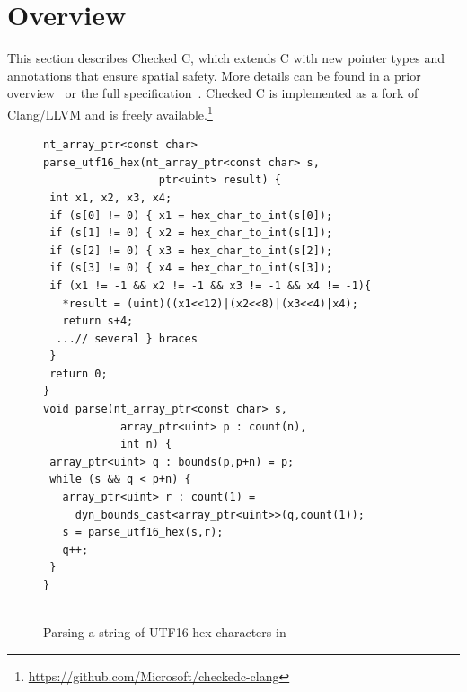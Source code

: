 \documentclass[conference]{IEEEtran}
\newcommand{\checkedc}{\text{Checked C}\xspace}
\begin{document}
 
\section{\checkedc Overview}\label{sec:overview}

This section describes Checked C, which extends C with new pointer
types and annotations that ensure spatial safety. More
details can be found in a prior overview~\cite{Elliott2018} or the
full specification~\cite{checkedc}.
Checked C is implemented as a fork of Clang/LLVM and is freely
available.\footnote{\url{https://github.com/Microsoft/checkedc-clang}}

\begin{figure}[t]
{\small
  \begin{lstlisting}[xleftmargin=4 mm]
nt_array_ptr<const char>
parse_utf16_hex(nt_array_ptr<const char> s,
                  ptr<uint> result) {
 int x1, x2, x3, x4;
 if (s[0] != 0) { x1 = hex_char_to_int(s[0]);
 if (s[1] != 0) { x2 = hex_char_to_int(s[1]);
 if (s[2] != 0) { x3 = hex_char_to_int(s[2]);
 if (s[3] != 0) { x4 = hex_char_to_int(s[3]);
 if (x1 != -1 && x2 != -1 && x3 != -1 && x4 != -1){
   *result = (uint)((x1<<12)|(x2<<8)|(x3<<4)|x4);
   return s+4;
  ...// several } braces
 } 
 return 0;
}
void parse(nt_array_ptr<const char> s,
            array_ptr<uint> p : count(n), 
            int n) {
 array_ptr<uint> q : bounds(p,p+n) = p;
 while (s && q < p+n) {
   array_ptr<uint> r : count(1) =
     dyn_bounds_cast<array_ptr<uint>>(q,count(1));
   s = parse_utf16_hex(s,r);
   q++;
 }
}
  
\end{lstlisting}

}

\caption{Parsing a string of UTF16 hex characters in \checkedc}
\label{fig:checkedc-example}
\end{figure}
\end{document}
